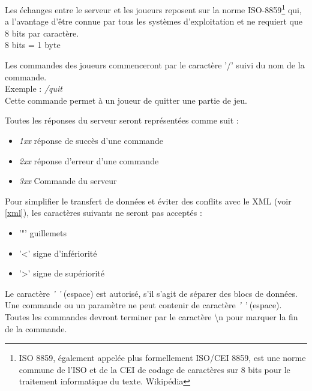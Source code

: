 \par
Les échanges entre le serveur et les joueurs reposent sur la norme ISO-8859\footnote{ISO 8859, également appelée plus formellement ISO/CEI 8859, est une norme commune de l'ISO et de la CEI de codage de caractères sur 8 bits pour le traitement informatique du texte. Wikipédia} qui, a l'avantage d'être connue par tous les systèmes d'exploitation et ne requiert que 8 bits par caractère. \\
8 bits = 1 byte \\

\par
Les commandes des joueurs commenceront par le caractère '/' suivi du nom de la commande. \\
Exemple : \textit{/quit} \\
Cette commande permet à un joueur de quitter une partie de jeu. \\

\par
Toutes les réponses du serveur seront représentées comme suit : 

\begin{itemize}
	\item \textit{1xx} réponse de succès d'une commande
	\item \textit{2xx} réponse d'erreur d'une commande 
	\item \textit{3xx} Commande du serveur \\
\end{itemize}

\newpage
\par
Pour simplifier le transfert de données et éviter des conflits avec le XML (voir \ref{xml}), les caractères suivants ne seront pas acceptés : 

\begin{itemize}
	\item '"' guillemets
	\item '<' signe d'infériorité
	\item '>' signe de supériorité \\
\end{itemize}

Le caractère \textit{' '} (espace) est autorisé, s'il s'agit de séparer des blocs de données. Une commande ou un paramètre ne peut contenir de caractère \textit{' '} (espace). \\

Toutes les commandes devront terminer par le caractère \textbackslash n pour marquer la fin de la commande. \\